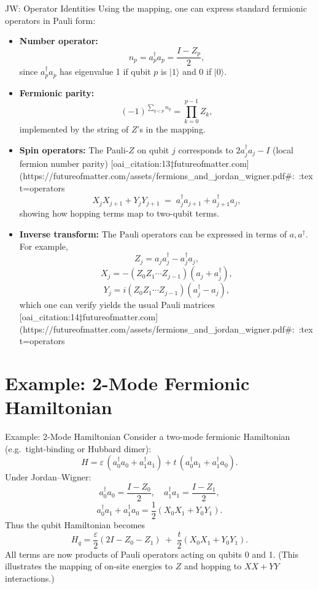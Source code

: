 \documentclass{beamer}
\begin{document}
\begin{frame}{JW: Operator Identities}
Using the mapping, one can express standard fermionic operators in Pauli form:
\begin{itemize}
  \item \textbf{Number operator:} 
  $$n_p = a_p^\dagger a_p = \frac{I - Z_p}{2},$$ 
  since $a_p^\dagger a_p$ has eigenvalue 1 if qubit $p$ is $|1\rangle$ and 0 if $|0\rangle$.
  \item \textbf{Fermionic parity:} 
  $$(-1)^{\sum_{q<p}n_q} = \prod_{k=0}^{p-1} Z_k,$$ 
  implemented by the string of $Z$'s in the mapping.
  \item \textbf{Spin operators:} The Pauli-$Z$ on qubit $j$ corresponds to $2a_j^\dagger a_j - I$ (local fermion number parity) [oai_citation:13‡futureofmatter.com](https://futureofmatter.com/assets/fermions_and_jordan_wigner.pdf#:~:text=operators%
  \[
    X_j X_{j+1} + Y_j Y_{j+1} 
    \;=\; a_j^\dagger a_{j+1} + a_{j+1}^\dagger a_j,
  \]
  showing how hopping terms map to two-qubit terms.
  \item \textbf{Inverse transform:} The Pauli operators can be expressed in terms of $a,a^\dagger$. For example, 
  \[
    Z_j = a_j a_j^\dagger - a_j^\dagger a_j,
  \]
  \[
    X_j = - (Z_0 Z_1 \cdots Z_{j-1})(a_j + a_j^\dagger),
  \] 
  \[
    Y_j = i(Z_0 Z_1 \cdots Z_{j-1})(a_j^\dagger - a_j),
  \] 
  which one can verify yields the usual Pauli matrices [oai_citation:14‡futureofmatter.com](https://futureofmatter.com/assets/fermions_and_jordan_wigner.pdf#:~:text=operators%
\end{itemize}
\end{frame}

\section{Example: 2-Mode Fermionic Hamiltonian}
\begin{frame}{Example: 2-Mode Hamiltonian}
Consider a two-mode fermionic Hamiltonian (e.g.\ tight-binding or Hubbard dimer):
\[
H = \varepsilon\,(a_0^\dagger a_0 + a_1^\dagger a_1) + t\,(a_0^\dagger a_1 + a_1^\dagger a_0).
\]
Under Jordan–Wigner:
\[
a_0^\dagger a_0 = \frac{I - Z_0}{2}, 
\quad
a_1^\dagger a_1 = \frac{I - Z_1}{2},
\]
\[
a_0^\dagger a_1 + a_1^\dagger a_0 
= \frac{1}{2}(X_0X_1 + Y_0Y_1).
\]
Thus the qubit Hamiltonian becomes
\[
H_{q} = \frac{\varepsilon}{2}(2I - Z_0 - Z_1) \;+\; \frac{t}{2}(X_0X_1 + Y_0Y_1).
\]
All terms are now products of Pauli operators acting on qubits 0 and 1.  (This illustrates the mapping of on-site energies to $Z$ and hopping to $XX+YY$ interactions.)
\end{frame}
\end{document}
